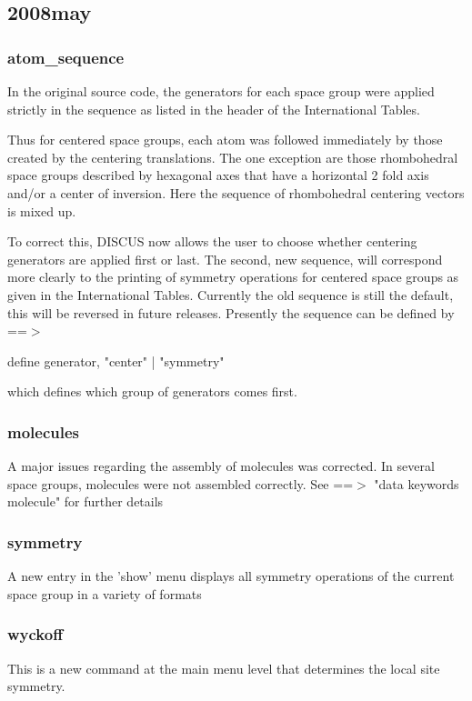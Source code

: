 \subsection*{2008may}
\subsubsection{atom\_sequence}
\par
In the original source code, the generators for each space group 
were applied strictly in the sequence as listed in the header of 
the International Tables. 
\par
Thus for centered space groups, each atom was followed immediately 
by those created by the centering translations. The one exception 
are those rhombohedral space groups described by hexagonal axes 
that have a horizontal 2 fold axis and/or a center of inversion. 
Here the sequence of rhombohedral centering vectors is mixed up. 
\par
To correct this, DISCUS now allows the user to choose whether 
centering generators are applied first or last. The second, new 
sequence, will correspond more clearly to the printing of 
symmetry operations for centered space groups as given in the 
International Tables. Currently the old sequence is still the 
default, this will be reversed in future releases. Presently 
the sequence can be defined by ==$> $ 
\begin{MacVerbatim}
define generator, {"center" | "symmetry"}
\end{MacVerbatim}
which defines which group of generators comes first. 
\subsubsection{molecules}
\par
A major issues regarding the assembly of molecules was corrected. 
In several space groups, molecules were not assembled correctly. 
See ==$> $ "data keywords molecule" for further details 
\subsubsection{symmetry}
\par
A new entry in the 'show' menu displays all symmetry operations 
of the current space group in a variety of formats 
\subsubsection{wyckoff}
\par
This is a new command at the main menu level that determines the 
local site symmetry. 
